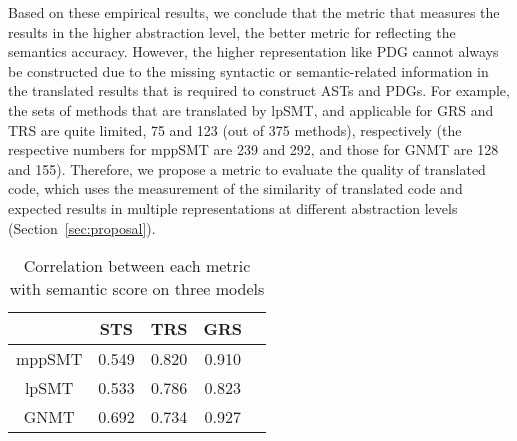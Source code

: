 Based on these empirical results, we conclude that the metric that
measures the results in the higher abstraction level, the better
metric for reflecting the semantics accuracy. However, the higher
representation like PDG cannot always be constructed due to the
missing syntactic or semantic-related information in the translated
results that is required to construct ASTs and PDGs. For example, the
sets of methods that are translated by lpSMT, and applicable for GRS
and TRS are quite limited, 75 and 123 (out of 375 methods),
respectively (the respective numbers for mppSMT are 239 and 292, and
those for GNMT are 128 and 155). Therefore, we propose a metric to
evaluate the quality of translated code, which uses the measurement of
the similarity of translated code and expected results in multiple
representations at different abstraction levels
(Section~\ref{sec:proposal}).


\begin{table}
\centering
\caption{Correlation between each metric with  semantic score on three models}
\begin{tabular}{|c|c|c|c|c|}
\hline
 & STS & TRS & GRS\\
\hline
mppSMT  & 0.549 & 0.820 & 0.910 \\
\hline
lpSMT  & 0.533 & 0.786 & 0.823 \\
\hline
GNMT & 0.692 & 0.734 & 0.927 \\
\hline
\end{tabular}
\label{table:correlation}
\end{table}


%

